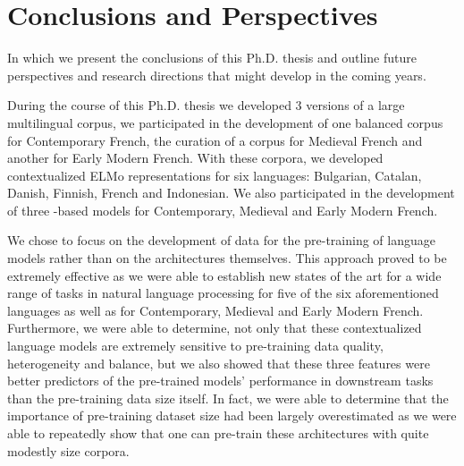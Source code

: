 \chapter{Conclusions and Perspectives}\label{chap:conclusions}

\begin{center}
    \begin{minipage}{0.66\textwidth}
        \begin{small}
            In which we present the conclusions of this Ph.D. thesis and outline future perspectives and research directions that might develop in the coming years.
        \end{small}
    \end{minipage}
    \vspace{0.5cm}
\end{center}

During the course of this Ph.D. thesis we developed 3 versions of a large multilingual corpus, we participated in the development of one balanced corpus for Contemporary French, the curation of a corpus for Medieval French and another for Early Modern French. With these corpora, we developed contextualized ELMo representations \citep{peters-etal-2018-deep} for six languages: Bulgarian, Catalan, Danish, Finnish, French and Indonesian. We also participated in the development of three \roberta-based \citep{liu-etal-2019-roberta} models for Contemporary, Medieval and Early Modern French. 

We chose to focus on the development of data for the pre-training of language models rather than on the architectures themselves. This approach proved to be extremely effective as we were able to establish new states of the art for a wide range of tasks in natural language processing for five of the six aforementioned languages as well as for Contemporary, Medieval and Early Modern French. Furthermore, we were able to determine, not only that these contextualized language models are extremely sensitive to pre-training data quality, heterogeneity and balance, but we also showed that these three features were better predictors of the pre-trained models' performance in downstream tasks than the pre-training data size itself. In fact, we were able to determine that the importance of pre-training dataset size had been largely overestimated \citep{martin-etal-2020-camembert} as we were able to repeatedly show that one can pre-train these architectures with quite modestly size corpora.

